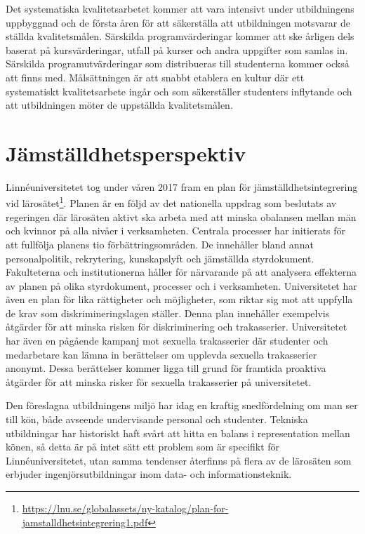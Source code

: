 Det systematiska kvalitetsarbetet kommer att vara intensivt under utbildningens uppbyggnad och de första åren för att säkerställa att utbildningen motsvarar de ställda kvalitetsmålen. Särskilda programvärderingar kommer att ske årligen dels baserat på kursvärderingar, utfall på kurser och andra uppgifter som samlas in. Särskilda programutvärderingar som distribueras till studenterna kommer också att finns med. Målsättningen är att snabbt etablera en kultur där ett systematiskt kvalitetsarbete ingår och som säkerställer studenters inflytande och att utbildningen möter de uppställda kvalitetsmålen.

\section{Jämställdhetsperspektiv}

Linnéuniversitetet tog under våren 2017 fram en plan för jämställdhetsintegrering vid lärosätet\footnote{\url{https://lnu.se/globalassets/ny-katalog/plan-for-jamstalldhetsintegrering1.pdf}}. Planen är en följd av det nationella uppdrag som beslutats av regeringen där lärosäten aktivt ska arbeta med att minska obalansen mellan män och kvinnor på alla nivåer i verksamheten. Centrala processer har initierats för att fullfölja planens tio förbättringsområden. De innehåller bland annat personalpolitik, rekrytering, kunskapslyft och jämställda styrdokument. Fakulteterna och institutionerna håller för närvarande på att analysera effekterna av planen på olika styrdokument, processer och i verksamheten. Universitetet har även en plan för lika rättigheter och möjligheter, som riktar sig mot att uppfylla de krav som diskrimineringslagen ställer. Denna plan innehåller exempelvis åtgärder för att minska risken för diskriminering och trakasserier. Universitetet har även en pågående kampanj mot sexuella trakasserier där studenter och medarbetare kan lämna in berättelser om upplevda sexuella trakasserier anonymt. Dessa berättelser kommer ligga till grund för framtida proaktiva åtgärder för att minska risker för sexuella trakasserier på universitetet.

Den föreslagna utbildningens miljö har idag en kraftig snedfördelning om man ser till kön, både avseende undervisande personal och studenter. Tekniska utbildningar har historiskt haft svårt att hitta en balans i representation mellan könen, så detta är på intet sätt ett problem som är specifikt för Linnéuniversitetet, utan samma tendenser återfinns på flera av de lärosäten som erbjuder ingenjörsutbildningar inom data- och informationsteknik.

